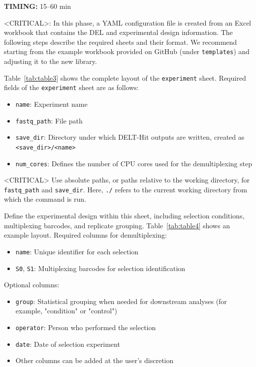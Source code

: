 \textbf{TIMING:} 15--60 min

<CRITICAL>: In this phase, a YAML configuration file is created from an Excel workbook that contains the DEL and experimental design information. The following steps describe the required sheets and their format. We recommend starting from the example workbook provided on GitHub (under \texttt{templates}) and adjusting it to the new library.



Table~\ref{tab:table3} shows the complete layout of the \texttt{experiment} sheet. Required fields of the \texttt{experiment} sheet are as follows: 

\begin{itemize}
  \item \texttt{name}: Experiment name
  \item \texttt{fastq\_path}: File path
  \item \texttt{save\_dir}: Directory under which DELT-Hit outputs are written, created as \texttt{\textless save\_dir\textgreater/\textless name\textgreater}
  \item \texttt{num\_cores}: Defines the number of CPU cores used for the demultiplexing step
\end{itemize}



<CRITICAL> Use absolute paths, or paths relative to the working directory, for \texttt{fastq\_path} and \texttt{save\_dir}. Here, \texttt{./} refers to the current working directory from which the command is run.



Define the experimental design within this sheet, including selection conditions, multiplexing barcodes, and replicate grouping. Table~\ref{tab:table4} shows an example layout. Required columns for demultiplexing:

\begin{itemize}
  \item \texttt{name}: Unique identifier for each selection
  \item \texttt{S0}, \texttt{S1}: Multiplexing barcodes for selection identification
\end{itemize}
Optional columns:

\begin{itemize}
  \item \texttt{group}: Statistical grouping when needed for downstream analyses (for example, "condition" or "control")
  \item \texttt{operator}: Person who performed the selection
  \item \texttt{date}: Date of selection experiment
  \item Other columns can be added at the user's discretion
\end{itemize}

